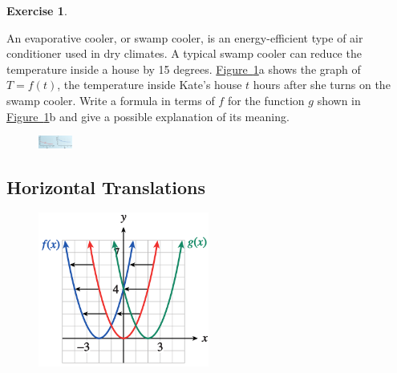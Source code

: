 \documentclass[10pt,]{book}
\theoremstyle{plain}
\theoremstyle{definition}
\newtheorem{exercise}[theorem]{Exercise}
\theoremstyle{definition}
\numberwithin{equation}{section}
\begin{document}
\begin{exercise}\label{exercise-swamp-cooler}

    An evaporative cooler, or swamp cooler, is an energy-efficient type of air conditioner used in dry climates. A typical swamp cooler can reduce the temperature inside a house by 15 degrees. \hyperref[fig-swamp-cooler]{Figure~\ref{fig-swamp-cooler}}a shows the graph of \(T = f (t)\), the temperature inside Kate’s house \(t\) hours after she turns on the swamp cooler. Write a formula in terms of \(f\) for the function \(g\) shown in \hyperref[fig-swamp-cooler]{Figure~\ref{fig-swamp-cooler}}b and give a possible explanation of its meaning.
    \leavevmode%
\begin{figure}
\centering
\includegraphics[width=0.100\textwidth,]{images/fig-swamp-cooler.svg}\caption{\label{fig-swamp-cooler}}
\end{figure}
\end{exercise}
\typeout{************************************************}
\typeout{************************************************}
\subsection[Horizontal Translations]{Horizontal Translations}\label{subsection-43}
\leavevmode%
\begin{figure}
\centering
\includegraphics[width=0.50\textwidth,]{images/fig-translate-parabs.svg}\caption{\label{fig-translate-parabs}}
\end{figure}
\end{document}
